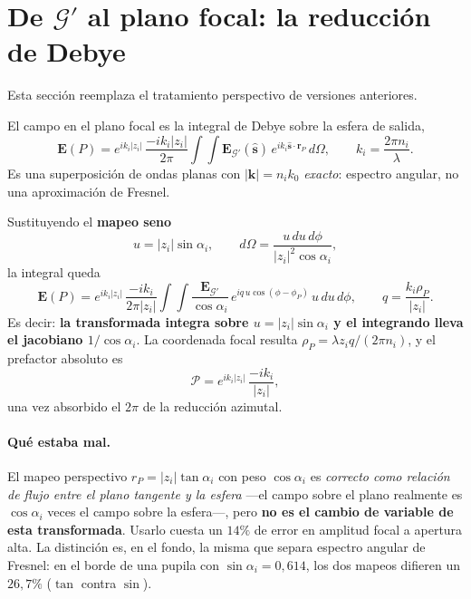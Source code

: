 \documentclass[11pt,a4paper]{article}
\newcommand{\E}{\mathbf{E}}
\begin{document}
\section{De $\mathcal{G}'$ al plano focal: la reducción de Debye}
\label{sec:debye}

Esta sección reemplaza el tratamiento perspectivo de versiones anteriores.

El campo en el plano focal es la integral de Debye sobre la esfera de salida,
\begin{equation}
  \E(P)=e^{ik_i|z_i|}\,\frac{-ik_i|z_i|}{2\pi}
  \int\!\!\int \E_{\mathcal{G}'}(\hat{\mathbf{s}})\,
  e^{ik_i\hat{\mathbf{s}}\cdot\mathbf{r}_P}\,d\Omega ,
  \qquad k_i=\frac{2\pi n_i}{\lambda}.
  \label{eq:debye}
\end{equation}
Es una superposición de ondas planas con $|\mathbf{k}|=n_ik_0$ \emph{exacto}:
espectro angular, no una aproximación de Fresnel.

Sustituyendo el \textbf{mapeo seno}
\begin{equation}
  u=|z_i|\sin\alpha_i,\qquad
  d\Omega=\frac{u\,du\,d\phi}{|z_i|^2\cos\alpha_i},
  \label{eq:sine}
\end{equation}
la integral queda
\begin{equation}
  \E(P)=e^{ik_i|z_i|}\,\frac{-ik_i}{2\pi|z_i|}
  \int\!\!\int \frac{\E_{\mathcal{G}'}}{\cos\alpha_i}\,
  e^{iq\,u\cos(\phi-\phi_P)}\,u\,du\,d\phi ,
  \qquad q=\frac{k_i\rho_P}{|z_i|}.
\end{equation}
Es decir: \textbf{la transformada integra sobre $u=|z_i|\sin\alpha_i$ y el
integrando lleva el jacobiano $1/\cos\alpha_i$}. La coordenada focal resulta
$\rho_P=\lambda z_i q/(2\pi n_i)$, y el prefactor absoluto es
\begin{equation}
  \mathcal{P}=e^{ik_i|z_i|}\,\frac{-ik_i}{|z_i|} ,
  \label{eq:prefactor}
\end{equation}
una vez absorbido el $2\pi$ de la reducción azimutal.

\paragraph{Qué estaba mal.} El mapeo perspectivo $r_P=|z_i|\tan\alpha_i$ con
peso $\cos\alpha_i$ es \emph{correcto como relación de flujo entre el plano
tangente y la esfera} ---el campo sobre el plano realmente es $\cos\alpha_i$
veces el campo sobre la esfera---, pero \textbf{no es el cambio de variable de
esta transformada}. Usarlo cuesta un $14\%$ de error en amplitud focal a
apertura alta. La distinción es, en el fondo, la misma que separa espectro
angular de Fresnel: en el borde de una pupila con
$\sin\alpha_i=0{,}614$, los dos mapeos difieren un $26{,}7\%$
($\tan$ contra $\sin$).
\end{document}
